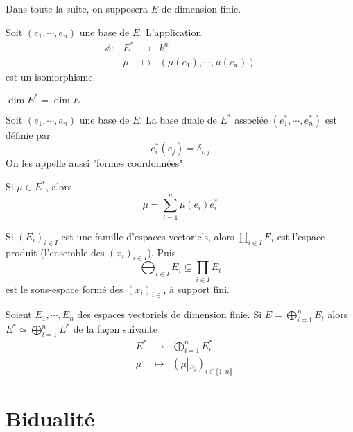 Dans toute la suite, on supposera $E$ de dimension finie.

\begin{thm}
    Soit $(e_1, \cdots , e_n)$ une base de $E$. L'application  \[
    \begin{array}{rrcl}
        \phi:& E^* & \longrightarrow & k^n \\
             & \mu & \longmapsto & \displaystyle (\mu(e_1), \cdots , \mu(e_n))
    \end{array}
    \] 
    est un isomorphisme.
\end{thm}

\begin{cor}
$\dim E^*=\dim E$
\end{cor}

\begin{cor}
    Soit $(e_1, \cdots , e_n)$ une base de $E$. La base duale de $E^*$ associée  $(e_1^*, \cdots , e_n^*)$ est définie par \[
        e_i^*(e_j)=\delta_{i,j}
    \] 
    On les appelle aussi "formes coordonnées".
\end{cor}

\begin{rem}
Si $\mu \in  E^*$, alors \[
    \mu = \sum_{i=1}^{n} \mu(e_i)e_i^*
\] 
\end{rem}

\begin{rem}[Notation]
    Si $(E_i)_{i \in  I}$ est une famille d'espaces vectoriels, alors $\prod_{i \in  I}E_i$ est l'espace produit (l'ensemble des $(x_i)_{i \in  I}$). Puis \[
        \bigoplus_{i \in  I}E_i \subseteq \prod_{i \in  I} E_i
    \] 
    est le sous-espace formé des $(x_i)_{i \in  I}$ à support fini.
\end{rem}

Soient $E_1, \cdots , E_n$ des espaces vectoriels de dimension finie. Si  $\displaystyle E = \bigoplus_{i=1}^nE_i$ alors $E^*\simeq \displaystyle \bigoplus_{i=1}^n E^*$ de la façon suivante  \[
\begin{array}{rrcl}
    & E^* & \longrightarrow & \displaystyle\bigoplus_{i=1}^nE_i^* \\
    & \mu & \longmapsto & \displaystyle (\mu\left|_{E_i}\right.)_{i \in  \llbracket 1, n \rrbracket }
\end{array}
\] 

\section{Bidualité}

